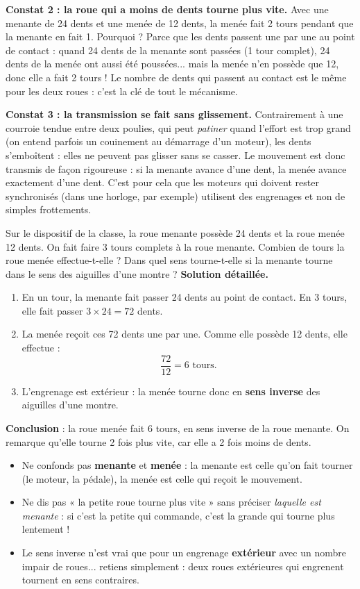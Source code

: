 \documentclass[11pt]{article}
\newcommand{\cle}[1]{{\popxbold\color{popdark}#1}}
\begin{document}
\textbf{Constat 2 : la roue qui a moins de dents tourne plus vite.} Avec une menante de 24 dents et une menée de 12 dents, la menée fait 2 tours pendant que la menante en fait 1. Pourquoi ? Parce que les dents passent une par une au point de contact : quand 24 dents de la menante sont passées (1 tour complet), 24 dents de la menée ont aussi été poussées... mais la menée n'en possède que 12, donc elle a fait 2 tours ! Le nombre de dents qui passent au contact est le même pour les deux roues : c'est la clé de tout le mécanisme.

\textbf{Constat 3 : la transmission se fait sans glissement.} Contrairement à une courroie tendue entre deux poulies, qui peut \emph{patiner} quand l'effort est trop grand (on entend parfois un couinement au démarrage d'un moteur), les dents s'emboîtent : elles ne peuvent pas glisser sans se casser. Le mouvement est donc transmis de façon \cle{rigoureuse} : si la menante avance d'une dent, la menée avance exactement d'une dent. C'est pour cela que les moteurs qui doivent rester synchronisés (dans une horloge, par exemple) utilisent des engrenages et non de simples frottements.

\begin{exoresolu}
Sur le dispositif de la classe, la roue menante possède 24 dents et la roue menée 12 dents. On fait faire 3 tours complets à la roue menante. Combien de tours la roue menée effectue-t-elle ? Dans quel sens tourne-t-elle si la menante tourne dans le sens des aiguilles d'une montre ?
\tcblower
\textbf{Solution détaillée.}
\begin{enumerate}
\item En un tour, la menante fait passer 24 dents au point de contact. En 3 tours, elle fait passer $3 \times 24 = 72$ dents.
\item La menée reçoit ces 72 dents une par une. Comme elle possède 12 dents, elle effectue :
\[ \frac{72}{12} = 6 \text{ tours.} \]
\item L'engrenage est extérieur : la menée tourne donc en \textbf{sens inverse} des aiguilles d'une montre.
\end{enumerate}
\textbf{Conclusion} : la roue menée fait 6 tours, en sens inverse de la roue menante. On remarque qu'elle tourne 2 fois plus vite, car elle a 2 fois moins de dents.
\end{exoresolu}

\begin{attention}
\begin{itemize}
\item Ne confonds pas \textbf{menante} et \textbf{menée} : la menante est celle qu'on fait tourner (le moteur, la pédale), la menée est celle qui reçoit le mouvement.
\item Ne dis pas « la petite roue tourne plus vite » sans préciser \emph{laquelle est menante} : si c'est la petite qui commande, c'est la grande qui tourne plus lentement !
\item Le sens inverse n'est vrai que pour un engrenage \textbf{extérieur} avec un nombre impair de roues... retiens simplement : deux roues extérieures qui engrenent tournent en sens contraires.
\end{itemize}
\end{attention}
\end{document}
